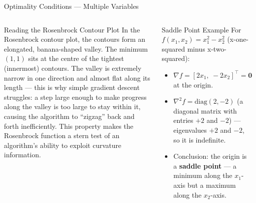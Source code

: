 \documentclass[aspectratio=169,10pt]{beamer}
\newcommand{\grad}{\nabla}
\newcommand{\hess}{\nabla^2}
\begin{document}
\begin{frame}[allowframebreaks]{Optimality Conditions --- Multiple Variables}
\begin{columns}[T]
\begin{block}{Reading the Rosenbrock Contour Plot}
        \medskip
        In the Rosenbrock contour plot, the contours form an elongated,
        banana-shaped valley.  The minimum $(1,1)$ sits at the centre of the
        tightest (innermost) contours.  The valley is extremely narrow in one
        direction and almost flat along its length --- this is why simple gradient
        descent struggles: a step large enough to make progress along the valley
        is too large to stay within it, causing the algorithm to ``zigzag''
        back and forth inefficiently.  This property makes the Rosenbrock
        function a stern test of an algorithm's ability to exploit curvature
        information.
      \end{block}
      \begin{exampleblock}{Saddle Point Example}
        For $f(x_1, x_2) = x_1^2 - x_2^2$ (x-one-squared minus x-two-squared):
        \begin{itemize}
          \item $\grad f = [2x_1,\; -2x_2]^\top = \mathbf{0}$ at the origin.
          \item $\hess f = \text{diag}(2, -2)$ (a diagonal matrix with entries
            $+2$ and $-2$) --- eigenvalues $+2$ and $-2$, so it is indefinite.
          \item Conclusion: the origin is a \textbf{saddle point} --- a minimum
            along the $x_1$-axis but a maximum along the $x_2$-axis.
        \end{itemize}
      \end{exampleblock}
  \end{columns}

\end{frame}
\end{document}
